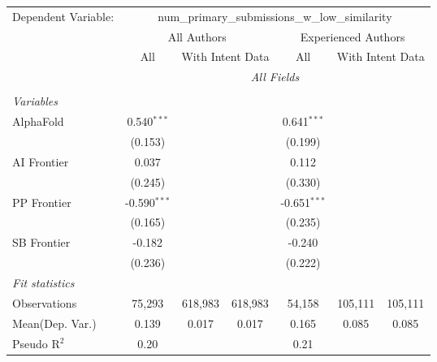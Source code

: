 \begingroup
\centering
\begin{tabular}{lcccccc}
   \tabularnewline \midrule \midrule
   Dependent Variable: & \multicolumn{6}{c}{num\_primary\_submissions\_w\_low\_similarity}\\
 & \multicolumn{3}{c}{All Authors} & \multicolumn{3}{c}{Experienced Authors} \\
\cmidrule(lr){2-4} \cmidrule(lr){5-7}
 & \multicolumn{1}{c}{All} & \multicolumn{2}{c}{With Intent Data} & \multicolumn{1}{c}{All} & \multicolumn{2}{c}{With Intent Data} \\
\cmidrule(lr){2-2} \cmidrule(lr){3-4} \cmidrule(lr){5-5} \cmidrule(lr){6-7}
 & \multicolumn{6}{c}{\textit{All Fields}} \\ \\
   \emph{Variables}\\
   AlphaFold    & 0.540$^{***}$  &         &         & 0.641$^{***}$  &         &   \\   
                & (0.153)        &         &         & (0.199)        &         &   \\   
   AI Frontier  & 0.037          &         &         & 0.112          &         &   \\   
                & (0.245)        &         &         & (0.330)        &         &   \\   
   PP Frontier  & -0.590$^{***}$ &         &         & -0.651$^{***}$ &         &   \\   
                & (0.165)        &         &         & (0.235)        &         &   \\   
   SB Frontier  & -0.182         &         &         & -0.240         &         &   \\   
                & (0.236)        &         &         & (0.222)        &         &   \\   
   \midrule
   \emph{Fit statistics}\\
   Observations & 75,293         & 618,983 & 618,983 & 54,158         & 105,111 & 105,111\\  
Mean(Dep. Var.) & 0.139 & 0.017 & 0.017 & 0.165 & 0.085 & 0.085 \\
   Pseudo R$^2$ & 0.20           &         &         & 0.21           &         & \\  
   

\end{tabular}

